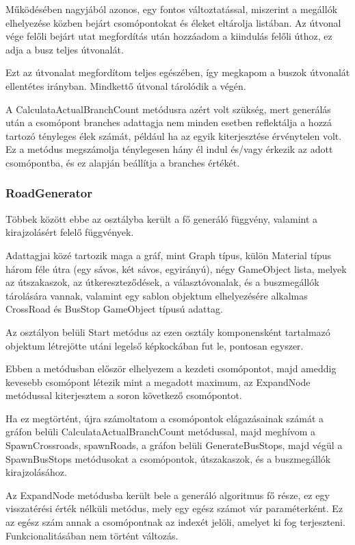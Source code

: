 Működésében nagyjából azonos, egy fontos változtatással, miszerint a megállók elhelyezése közben bejárt csomópontokat és éleket eltárolja listában. Az útvonal vége felőli bejárt utat megfordítás után hozzáadom a kiindulás felőli úthoz, ez adja a busz teljes útvonalát.

Ezt az útvonalat megfordítom teljes egészében, így megkapom a buszok útvonalát ellentétes irányban. Mindkettő útvonal tárolódik a végén.

A CalculataActualBranchCount metódusra azért volt szükség, mert generálás után a csomópont branches adattagja nem minden esetben reflektálja a hozzá tartozó tényleges élek számát, például ha az egyik kiterjesztése érvénytelen volt. Ez a metódus megszámolja ténylegesen hány él indul és/vagy érkezik az adott csomópontba, és ez alapján beállítja a branches értékét.
\subsubsection{RoadGenerator}
Többek között ebbe az osztályba került a fő generáló függvény, valamint a kirajzolásért felelő függvények.

Adattagjai közé tartozik maga a gráf, mint Graph típus, külön Material típus három féle útra (egy sávos, két sávos, egyirányú), négy GameObject lista, melyek az útszakaszok, az útkereszteződések, a választóvonalak, és a buszmegállók tárolására vannak, valamint egy sablon objektum elhelyezésére alkalmas CrossRoad és BusStop GameObject típusú adattag.

Az osztályon belüli Start metódus az ezen osztály komponensként tartalmazó objektum létrejötte utáni legelső képkockában fut le, pontosan egyszer.

Ebben a metódusban először elhelyezem a kezdeti csomópontot, majd ameddig kevesebb csomópont létezik mint a megadott maximum, az ExpandNode metódussal kiterjesztem a soron következő csomópontot.

Ha ez megtörtént, újra számoltatom a csomópontok elágazásainak számát a gráfon belüli CalculataActualBranchCount metódussal, majd meghívom a SpawnCrossroads, spawnRoads, a gráfon belüli GenerateBusStops, majd végül a SpawnBusStops metódusokat a csomópontok, útszakaszok, és a buszmegállók kirajzolásához.

Az ExpandNode metódusba került bele a generáló algoritmus fő része, ez egy visszatérési érték nélküli metódus, mely egy egész számot vár paraméterként. Ez az egész szám annak a csomópontnak az indexét jelöli, amelyet ki fog terjeszteni. Funkcionalitásában nem történt változás.

